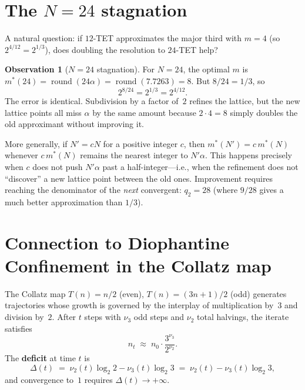 \documentclass[12pt]{article}
\theoremstyle{plain}
\theoremstyle{definition}
\newtheorem{observation}[theorem]{Observation}
\theoremstyle{remark}
\numberwithin{equation}{section}
\begin{document}
\section{The \texorpdfstring{$N=24$}{N=24} stagnation}
\label{sec:stagnation}

A natural question: if $12$-TET approximates the major third with
$m=4$ (so $2^{4/12} = 2^{1/3}$), does doubling the resolution to
$24$-TET help?

\begin{observation}[$N=24$ stagnation]
For $N=24$, the optimal $m$ is $m^*(24) = \operatorname{round}(24\alpha)
= \operatorname{round}(7.7263) = 8$.  But $8/24 = 1/3$, so
\[
  2^{8/24} = 2^{1/3} = 2^{4/12}.
\]
The error is identical.  Subdivision by a factor of~$2$ refines the
lattice, but the new lattice points all miss $\alpha$ by the same
amount because $2 \cdot 4 = 8$ simply doubles the old approximant
without improving it.
\end{observation}

More generally, if $N' = cN$ for a positive integer $c$, then $m^*(N')
= c\,m^*(N)$ whenever $c\,m^*(N)$ remains the nearest integer to
$N'\alpha$.  This happens precisely when $c$ does not push $N'\alpha$
past a half-integer---i.e., when the refinement does not ``discover''
a new lattice point between the old ones.  Improvement requires reaching
the denominator of the \emph{next} convergent: $q_2 = 28$ (where $9/28$
gives a much better approximation than $1/3$).

\section{Connection to Diophantine Confinement in the Collatz map}
\label{sec:collatz}

The Collatz map $T(n) = n/2$ (even), $T(n) = (3n+1)/2$ (odd)
generates trajectories whose growth is governed by the interplay
of multiplication by~$3$ and division by~$2$.  After $t$ steps with
$\nu_3$ odd steps and $\nu_2$ total halvings, the iterate satisfies
\[
  n_t \;\approx\; n_0 \cdot \frac{3^{\nu_3}}{2^{\nu_2}}.
\]
The \textbf{deficit} at time $t$ is
\begin{equation}\label{eq:deficit}
  \Delta(t) \;=\; \nu_2(t)\log_2 2 - \nu_3(t)\log_2 3
  \;=\; \nu_2(t) - \nu_3(t)\log_2 3,
\end{equation}
and convergence to~$1$ requires $\Delta(t) \to +\infty$.
\end{document}
